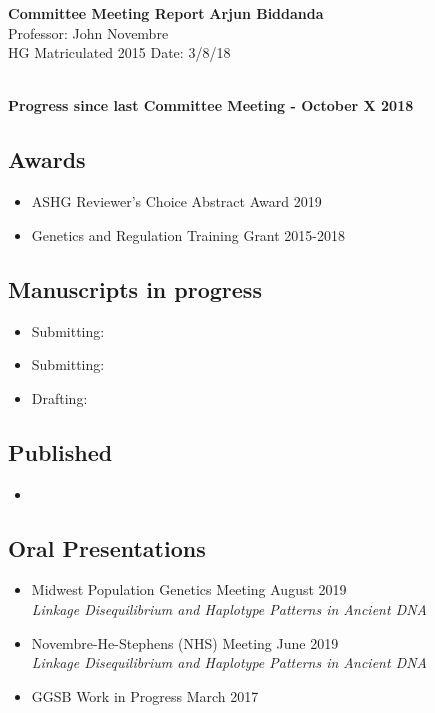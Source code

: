 \documentclass[a4paper, 11pt]{article}
\begin{document}
\noindent
\large\textbf{Committee Meeting Report} \hfill \textbf{Arjun Biddanda} \\
\normalsize  \hfill Professor: John Novembre  \\
HG Matriculated 2015 \hfill Date: 3/8/18 \\
\noindent\makebox[\linewidth]{\rule{\paperwidth}{0.4pt}}

\large\textbf{\\Progress since last Committee Meeting - October X 2018}
\subsection*{Awards}
\begin{itemize}
    \item ASHG Reviewer's Choice Abstract Award  \hfill 2019 
    \item Genetics and Regulation Training Grant \hfill 2015-2018
\end{itemize} 

\subsection*{Manuscripts in progress}
\begin{itemize}
    \item Submitting: 
    \item Submitting:
		\item Drafting:
\end{itemize}

\subsection*{Published}
\begin{itemize}
    \item {}
\end{itemize}


\subsection*{Oral Presentations}
\begin{itemize}
	\item Midwest Population Genetics Meeting \hfill August 2019 \\ \emph{Linkage Disequilibrium and Haplotype Patterns in Ancient DNA}
	\item Novembre-He-Stephens (NHS) Meeting \hfill June 2019 \\ \emph{Linkage Disequilibrium and Haplotype Patterns in Ancient DNA}   
	\item GGSB Work in Progress \hfill March 2017\\ \emph{}
\end{itemize}
\end{document}
